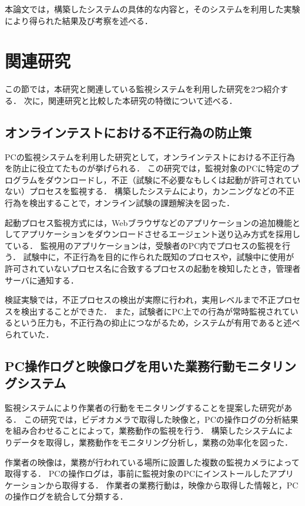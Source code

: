本論文では，構築したシステムの具体的な内容と，そのシステムを利用した実験により得られた結果及び考察を述べる．

\section{関連研究}
この節では，本研究と関連している監視システムを利用した研究を2つ紹介する．
次に，関連研究と比較した本研究の特徴について述べる．

\subsection{オンラインテストにおける不正行為の防止策}
PCの監視システムを利用した研究として，オンラインテストにおける不正行為を防止に役立てたものが挙げられる．\cite{Hari2006}
この研究では，監視対象のPCに特定のプログラムをダウンロードし，不正（試験に不必要なもしくは起動が許可されていない）プロセスを監視する．
構築したシステムにより，カンニングなどの不正行為を検出することで，オンライン試験の課題解決を図った．

起動プロセス監視方式には，Webブラウザなどのアプリケーションの追加機能としてアプリケーションをダウンロードさせるエージェント送り込み方式を採用している．
監視用のアプリケーションは，受験者のPC内でプロセスの監視を行う．
試験中に，不正行為を目的に作られた既知のプロセスや，試験中に使用が許可されていないプロセス名に合致するプロセスの起動を検知したとき，管理者サーバに通知する．

検証実験では，不正プロセスの検出が実際に行われ，実用レベルまで不正プロセスを検出することができた．
また，試験者にPC上での行為が常時監視されているという圧力も，不正行為の抑止につながるため，システムが有用であると述べられていた．

\subsection{PC操作ログと映像ログを用いた業務行動モニタリングシステム}
監視システムにより作業者の行動をモニタリングすることを提案した研究がある．\cite{Toba2010}
この研究では，ビデオカメラで取得した映像と，PCの操作ログの分析結果を組み合わせることによって，業務動作の監視を行う．
構築したシステムによりデータを取得し，業務動作をモニタリング分析し，業務の効率化を図った．

作業者の映像は，業務が行われている場所に設置した複数の監視カメラによって取得する．
PCの操作ログは，事前に監視対象のPCにインストールしたアプリケーションから取得する．
作業者の業務行動は，映像から取得した情報と，PCの操作ログを統合して分類する．

